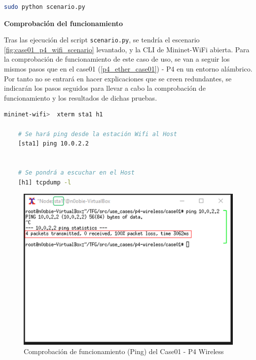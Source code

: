 \begin{lstlisting}[language= bash, style=Consola, caption={Puesta en marcha del escenario  - Case01},label=code:case01_p4_wifi_run]
    sudo python scenario.py
\end{lstlisting}
\vspace{0.2cm}


\vspace{0.5cm}
\textbf{Comprobación del funcionamiento}\\
\par

Tras las ejecución del script \texttt{scenario.py}, se tendría el escenario \ref{fig:case01_p4_wifi_scenario} levantado, y la CLI de Mininet-WiFi abierta. Para la comprobación de funcionamiento de este caso de uso, se van a seguir los mismos pasos que en el case01 (\ref{p4_ether_case01}) - P4 en un entorno alámbrico. Por tanto no se entrará en hacer explicaciones que se creen redundantes, se indicarán los pasos seguidos para llevar a cabo la comprobación de funcionamiento y los resultados de dichas pruebas. 

\begin{lstlisting}[language= bash, style=Consola, caption={Pasos a seguir para comprobar el funcionamiento - Case01},label=code:case01_p4_wifi_func1]
    mininet-wifi>  xterm sta1 h1
    
    # Se hará ping desde la estación Wifi al Host
    [sta1] ping 10.0.2.2
    
    
    # Se pondrá a escuchar en el Host
    [h1] tcpdump -l

\end{lstlisting}
\vspace{0.5cm}


\begin{figure}[ht]
    \centering
    \includegraphics[width=14cm]{archivos/img/dev/p4-wifi/case01/demo_case01_1_edited.png}
    \caption{Comprobación de funcionamiento (Ping) del Case01 - P4 Wireless}
    \label{fig:case01_p4_wifi_func1}
\end{figure}
\vspace{0.5cm}


